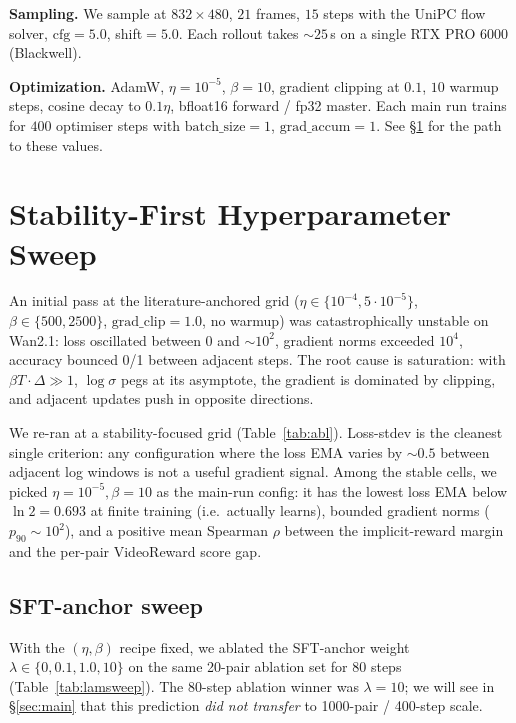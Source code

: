 \documentclass{article}
\begin{document}
\textbf{Sampling.} We sample at $832{\times}480$, $21$ frames, $15$ steps with the UniPC flow solver, $\text{cfg}{=}5.0$, shift${=}5.0$.  Each rollout takes $\sim$$25$\,s on a single RTX PRO 6000 (Blackwell).

\textbf{Optimization.}  AdamW, $\eta{=}10^{-5}$, $\beta{=}10$, gradient clipping at $0.1$, $10$ warmup steps, cosine decay to $0.1\eta$, bfloat16 forward / fp32 master.  Each main run trains for $400$ optimiser steps with $\text{batch\_size}{=}1$, $\text{grad\_accum}{=}1$.  See \S\ref{sec:ablation} for the path to these values.

\section{Stability-First Hyperparameter Sweep}
\label{sec:ablation}

An initial pass at the literature-anchored grid ($\eta{\in}\{10^{-4}, 5{\cdot}10^{-5}\}$, $\beta{\in}\{500, 2500\}$, $\text{grad\_clip}{=}1.0$, no warmup) was catastrophically unstable on Wan2.1: loss oscillated between $0$ and $\sim$$10^{2}$, gradient norms exceeded $10^{4}$, accuracy bounced 0/1 between adjacent steps.  The root cause is saturation: with $\beta T \cdot \Delta \gg 1$, $\log\sigma$ pegs at its asymptote, the gradient is dominated by clipping, and adjacent updates push in opposite directions.

We re-ran at a stability-focused grid (Table~\ref{tab:abl}).  Loss-stdev is the cleanest single criterion: any configuration where the loss EMA varies by $\sim$$0.5$ between adjacent log windows is not a useful gradient signal.  Among the stable cells, we picked $\eta{=}10^{-5}, \beta{=}10$ as the main-run config: it has the lowest loss EMA below $\ln 2{=}0.693$ at finite training (i.e.\ actually learns), bounded gradient norms ($p_{90}{\sim}10^{2}$), and a positive mean Spearman $\rho$ between the implicit-reward margin and the per-pair VideoReward score gap.

\begin{table}[t]
\centering
\caption{Stability-focused hyperparameter sweep on the ablation split, MQ reward, $80$ steps each.  Sorted by training-loss standard deviation.  $\rho$ is the per-step Spearman correlation between implicit DPO margin and the VideoReward score gap, averaged over training.  We picked $\eta{=}10^{-5}, \beta{=}10$ as the main config.}
\label{tab:abl}

\end{table}

\subsection{SFT-anchor sweep}
\label{sec:lam}
With the $(\eta, \beta)$ recipe fixed, we ablated the SFT-anchor weight $\lambda{\in}\{0, 0.1, 1.0, 10\}$ on the same 20-pair ablation set for $80$ steps (Table~\ref{tab:lamsweep}).  The 80-step ablation winner was $\lambda{=}10$; we will see in \S\ref{sec:main} that this prediction \emph{did not transfer} to 1000-pair / 400-step scale.
\end{document}
